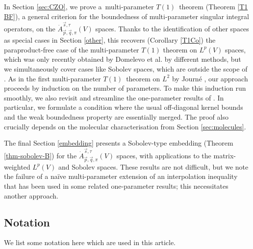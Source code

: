 \documentclass[11pt, reqno]{amsart}
\theoremstyle{definition}
\theoremstyle{remark}
\numberwithin{equation}{section}
\newcommand{\vp}{\vec p}
\newcommand{\vq}{\vec q}
\newcommand{\vs}{\vec s}
\newcommand{\Atau}{\dot A^{\vs,\tau}_{\vp,\vq,\pi}}
\begin{document}
In Section \ref{sec:CZO}, we prove a multi-parameter $T(1)$ theorem (Theorem \ref{T1 BF}), a general criterion for the boundedness of multi-parameter singular integral operators, on the $\Atau(V)$ spaces. Thanks to the identification of other spaces as special cases in Section \ref{other}, this recovers (Corollary \ref{T1Co}) the paraproduct-free case of the multi-parameter $T(1)$ theorem on $L^p(V)$ spaces, which was only recently obtained by Domelevo et al. \cite{DKPS} by different methods, but we simultaneously cover cases like Sobolev spaces, which are outside the scope of \cite{DKPS}. As in the first multi-parameter $T(1)$ theorem on $L^2$ by Journ\'e \cite{Journe}, our approach proceeds by induction on the number of parameters. To make this induction run smoothly, we also revisit and streamline the one-parameter results of \cite{BHYY:1c}. In particular, we formulate a condition where the usual off-diagonal kernel bounds and the weak boundedness property are essentially merged. The proof also crucially depends on the molecular characterisation from Section \ref{sec:molecules}.

The final Section \ref{embedding} presents a Sobolev-type embedding (Theorem \ref{thm-sobolev-B}) for the $\Atau(V)$ spaces, with applications to the matrix-weighted $L^p(V)$ and Sobolev spaces. These results are not difficult, but we note the failure of a na\"ive multi-parameter extension of an interpolation inequality that has been used in some related one-parameter results; this necessitates another approach.


\subsection{Notation}\label{Symbols}
We list some notation here which are used in this article.
\end{document}
